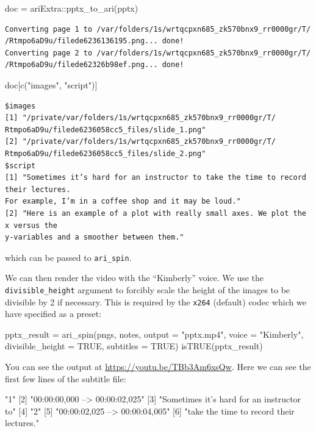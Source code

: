 \begin{Schunk}
\begin{Sinput}
doc = ariExtra::pptx_to_ari(pptx)
\end{Sinput}
\end{Schunk}

\begin{verbatim}
Converting page 1 to /var/folders/1s/wrtqcpxn685_zk570bnx9_rr0000gr/T/
/Rtmpo6aD9u/filede6236136195.png... done!
Converting page 2 to /var/folders/1s/wrtqcpxn685_zk570bnx9_rr0000gr/T/
/Rtmpo6aD9u/filede62326b98ef.png... done!
\end{verbatim}

\begin{Schunk}
\begin{Sinput}
doc[c("images", "script")]
\end{Sinput}
\end{Schunk}

\begin{verbatim}
$images
[1] "/private/var/folders/1s/wrtqcpxn685_zk570bnx9_rr0000gr/T/
Rtmpo6aD9u/filede6236058cc5_files/slide_1.png"
[2] "/private/var/folders/1s/wrtqcpxn685_zk570bnx9_rr0000gr/T/
Rtmpo6aD9u/filede6236058cc5_files/slide_2.png"
$script
[1] "Sometimes it’s hard for an instructor to take the time to record their lectures. 
For example, I’m in a coffee shop and it may be loud."
[2] "Here is an example of a plot with really small axes. We plot the x versus the 
y-variables and a smoother between them."
\end{verbatim}

which can be passed to \texttt{ari\_spin}.

We can then render the video with the ``Kimberly'' voice. We use the
\texttt{divisible\_height} argument to forcibly scale the height of the
images to be divisible by 2 if necessary. This is required by the
\texttt{x264} (default) codec which we have specified as a preset:

\begin{Schunk}
\begin{Sinput}
pptx_result = ari_spin(pngs, notes, output = "pptx.mp4", voice = "Kimberly",
    divisible_height = TRUE, subtitles = TRUE)
isTRUE(pptx_result)
\end{Sinput}
\end{Schunk}

You can see the output at \url{https://youtu.be/TBb3Am6xsQw}. Here we
can see the first few lines of the subtitle file:

\begin{Schunk}
\begin{Soutput}
[1] "1"                                       
[2] "00:00:00,000 --> 00:00:02,025"           
[3] "Sometimes it’s hard for an instructor to"
[4] "2"                                       
[5] "00:00:02,025 --> 00:00:04,005"           
[6] "take the time to record their lectures." 
\end{Soutput}
\end{Schunk}

